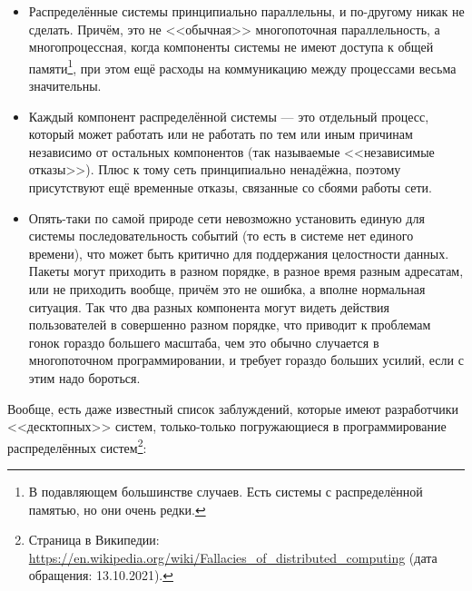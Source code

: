 \documentclass{../../text-style}
\begin{document}
\begin{itemize}
    \item Распределённые системы принципиально параллельны, и по-другому никак не сделать. Причём, это не <<обычная>> многопоточная параллельность, а многопроцессная, когда компоненты системы не имеют доступа к общей памяти\footnote{В подавляющем большинстве случаев. Есть системы с распределённой памятью, но они очень редки.}, при этом ещё расходы на коммуникацию между процессами весьма значительны.
    \item Каждый компонент распределённой системы --- это отдельный процесс, который может работать или не работать по тем или иным причинам независимо от остальных компонентов (так называемые <<независимые отказы>>). Плюс к тому сеть принципиально ненадёжна, поэтому присутствуют ещё временные отказы, связанные со сбоями работы сети.
    \item Опять-таки по самой природе сети невозможно установить единую для системы последовательность событий (то есть в системе нет единого времени), что может быть критично для поддержания целостности данных. Пакеты могут приходить в разном порядке, в разное время разным адресатам, или не приходить вообще, причём это не ошибка, а вполне нормальная ситуация. Так что два разных компонента могут видеть действия пользователей в совершенно разном порядке, что приводит к проблемам гонок гораздо большего масштаба, чем это обычно случается в многопоточном программировании, и требует гораздо больших усилий, если с этим надо бороться.
\end{itemize}

Вообще, есть даже известный список заблуждений, которые имеют разработчики <<десктопных>> систем, только-только погружающиеся в программирование распределённых систем\footnote{Страница в Википедии: \url{ https://en.wikipedia.org/wiki/Fallacies_of_distributed_computing} (дата обращения: 13.10.2021).}:
\end{document}
